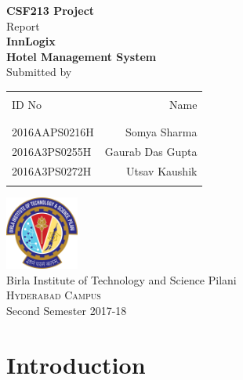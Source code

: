 \documentclass{scrreprt}
\date{}
\begin{document}
\begin{titlepage}

\begin{center}

\textup{\small {\bf CSF213 Project} \\ Report}\\[0.2in]

\Large \textbf {InnLogix\\Hotel Management System}\\[0.5in]



\normalsize Submitted by \\
\begin{table}[h]
\centering
\begin{tabular}{lr}\hline \\
ID No & Name \\ \\ \hline
\\
2016AAPS0216H & Somya Sharma \\
2016A3PS0255H & Gaurab Das Gupta \\ 
2016A3PS0272H & Utsav Kaushik\\ \\ \hline 
\end{tabular}
\end{table}

\vspace{4cm}

\includegraphics[width=0.18\textwidth]{logo}\\[0.1in]
\Large{Birla Institute of Technology and Science Pilani}\\
\normalsize
\textsc{Hyderabad Campus}
\vspace{0.2cm}\\
Second Semester 2017-18

\end{center}

\end{titlepage}

\tableofcontents


\chapter{Introduction}
\end{document}

